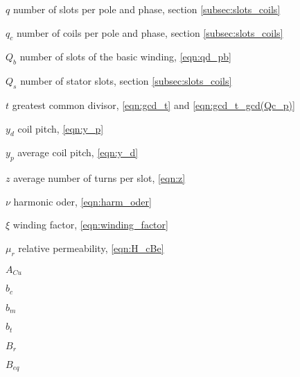 \begin{Nomencl}
   \item[$q$]              number of slots per pole and phase, %
                           section \ref{subsec:slots_coils}
   \item[$q_{c}$]          number of coils per pole and phase, %
                           section \ref{subsec:slots_coils}
   
   \item[$Q_{b}$]          number of slots of the basic winding, %
                           \eqref{eqn:qd_pb} 
   \item[$Q_{s}$]          number of stator slots, section \ref{subsec:slots_coils}    
   
	 \item[$t$]              greatest common divisor, %
	                         \eqref{eqn:gcd_t} and \eqref{eqn:gcd_t_gcd(Qc_p)}
	 
	 \item[$y_{d}$]          coil pitch, \eqref{eqn:y_p}    
	 \item[$y_{p}$]          average coil pitch, \eqref{eqn:y_d} 
	    
	 \item[$z$]              average number of turns per slot, \eqref{eqn:z}	 	 
	 
	 \item[$\nu$]            harmonic oder, \eqref{eqn:harm_oder}
	 \item[$\xi$]            winding factor, \eqref{eqn:winding_factor}
	 \item[$\mu_{r}$]        relative permeability, \eqref{eqn:H_cBe}	 
   
 
   \item[$A_{Cu}$]           
                           
   \item[$b_{c}$]            
   \item[$b_{m}$]           
   \item[$b_{t}$]           
   \item[$B_{r}$]          
   \item[$B_{eq}$]         
 

\end{Nomencl}
